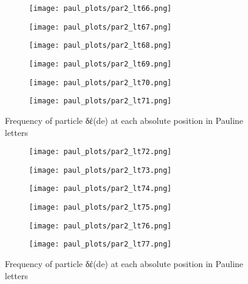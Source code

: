 \documentclass[a4paper]{article}
\renewcommand{\textgreek}[1]{{\selectlanguage{greek}#1}}
\begin{document}
\begin{figure}
\begin{subfigure}{0.45\textwidth}
\centering
\texttt{[image: paul\_plots/par2\_lt66.png]}
\end{subfigure}
\begin{subfigure}{0.45\textwidth}
\centering
\texttt{[image: paul\_plots/par2\_lt67.png]}
\end{subfigure}
\begin{subfigure}{0.45\textwidth}
\centering
\texttt{[image: paul\_plots/par2\_lt68.png]}
\end{subfigure}
\begin{subfigure}{0.45\textwidth}
\centering
\texttt{[image: paul\_plots/par2\_lt69.png]}
\end{subfigure}
\begin{subfigure}{0.45\textwidth}
\centering
\texttt{[image: paul\_plots/par2\_lt70.png]}
\end{subfigure}
\begin{subfigure}{0.45\textwidth}
\centering
\texttt{[image: paul\_plots/par2\_lt71.png]}
\end{subfigure}
\caption{Frequency of particle \textgreek{δέ}(de) at each absolute position in Pauline letters}
\label{paul_de}
\end{figure}

\begin{figure}
\ContinuedFloat
\begin{subfigure}{0.45\textwidth}
\centering
\texttt{[image: paul\_plots/par2\_lt72.png]}
\end{subfigure}
\begin{subfigure}{0.45\textwidth}
\centering
\texttt{[image: paul\_plots/par2\_lt73.png]}
\end{subfigure}
\begin{subfigure}{0.45\textwidth}
\centering
\texttt{[image: paul\_plots/par2\_lt74.png]}
\end{subfigure}
\begin{subfigure}{0.45\textwidth}
\centering
\texttt{[image: paul\_plots/par2\_lt75.png]}
\end{subfigure}
\begin{subfigure}{0.45\textwidth}
\centering
\texttt{[image: paul\_plots/par2\_lt76.png]}
\end{subfigure}
\begin{subfigure}{0.45\textwidth}
\centering
\texttt{[image: paul\_plots/par2\_lt77.png]}
\end{subfigure}
\caption{Frequency of particle \textgreek{δέ}(de) at each absolute position in Pauline letters}
\end{figure}
\end{document}
